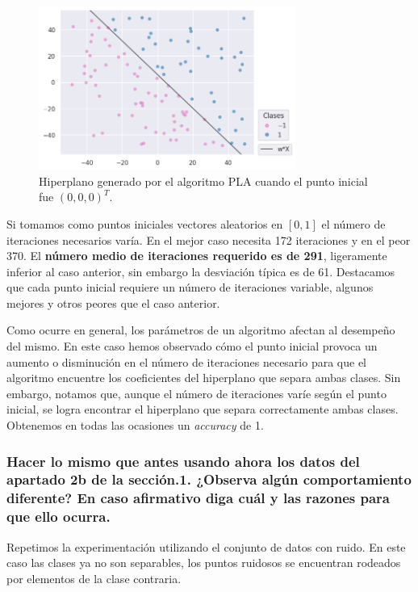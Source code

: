 \documentclass[a4paper, 20pt]{article}
\begin{document}
\begin{figure}[H]
    \centering
    \includegraphics[width=0.75\textwidth]{21}
    \caption{Hiperplano generado por el algoritmo PLA cuando el punto inicial fue $(0,0,0)^T$.}
    \label{fig:21}
\end{figure}

Si tomamos como puntos iniciales vectores aleatorios en $[0,1]$ el número de iteraciones necesarios varía. En el mejor caso necesita 172 iteraciones y en el peor 370. El \textbf{número medio de iteraciones requerido es de 291}, ligeramente inferior al caso anterior, sin embargo la desviación típica es de 61. Destacamos que cada punto inicial requiere un número de iteraciones variable, algunos mejores y otros peores que el caso anterior.

Como ocurre en general, los parámetros de un algoritmo afectan al desempeño del mismo. En este caso hemos observado cómo el punto inicial provoca un aumento o disminución en el número de iteraciones necesario para que el algoritmo encuentre los coeficientes del hiperplano que separa ambas clases. Sin embargo, notamos que, aunque el número de iteraciones varíe según el punto inicial, se logra encontrar el hiperplano que separa correctamente ambas clases. Obtenemos en todas las ocasiones un \textit{accuracy} de 1.

\subsubsection{Hacer lo mismo que antes usando ahora los datos del apartado 2b de la sección.1. ¿Observa algún comportamiento diferente? En caso afirmativo diga cuál y las razones para que ello ocurra.}

Repetimos la experimentación utilizando el conjunto de datos con ruido. En este caso las clases ya no son separables, los puntos ruidosos se encuentran rodeados por elementos de la clase contraria.
\end{document}

